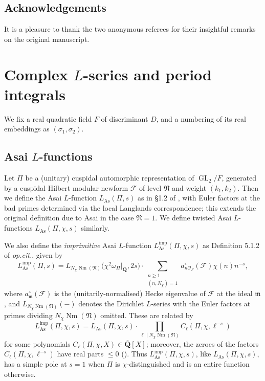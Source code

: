 \documentclass[a4paper,10pt]{amsart}
\theoremstyle{plain}
\theoremstyle{remark}
\DeclareMathOperator{\GL}{GL}
\DeclareMathOperator{\imp}{imp}
\DeclareMathOperator{\Nm}{Nm}
\DeclareMathOperator{\As}{As}
\newcommand{\QQbar}{\overline{\QQ}}
\newcommand{\QQ}{\mathbf{Q}}
\newcommand{\fN}{\mathfrak{N}}
\newcommand{\cF}{\mathcal{F}}
\newcommand{\cO}{\mathcal{O}}
\numberwithin{equation}{section}
\renewcommand{\le}{\leqslant}
\renewcommand{\ge}{\geqslant}
\begin{document}
 \subsection*{Acknowledgements} It is a pleasure to thank the two anonymous referees for their insightful remarks on the original manuscript.


\section{Complex $L$-series and period integrals}

 We fix a real quadratic field $F$ of discriminant $D$, and a numbering of its real embeddings as $(\sigma_1, \sigma_2)$.

 \subsection{Asai $L$-functions}

   Let $\Pi$ be a (unitary) cuspidal automorphic representation of $\GL_2 / F$, generated by a cuspidal Hilbert modular newform $\cF$ of level $\fN$ and weight $(k_1, k_2)$. Then we define the Asai $L$-function $L_{\As}(\Pi, s)$ as in \S 1.2 of \cite{grossiloefflerzerbesLfunct}, with Euler factors at the bad primes determined via the local Langlands correspondence; this extends the original definition due to Asai \cite{asai77} in the case $\fN = 1$. We define twisted Asai $L$-functions $L_{\As}(\Pi, \chi, s)$ similarly.

   We also define the \emph{imprimitive} Asai $L$-function $L_{\As}^{\imp}(\Pi, \chi, s)$ as Definition 5.1.2 of \emph{op.cit.}, given by
   \[
    L_{\As}^{\imp}(\Pi, s) = L_{N_\chi \Nm(\fN)} \Big(\chi^2 \omega_{\Pi} |_{\QQ}, 2s\Big) \cdot \sum_{\substack{n \ge 1 \\ (n, N_\chi) = 1}} a^\circ_{n \cO_F}(\cF) \chi(n) n^{-s},
   \]
   where $a^\circ_{\mathfrak{m}}(\cF)$ is the (unitarily-normalised) Hecke eigenvalue of $\cF$ at the ideal $\mathfrak{m}$, and $L_{N_\chi \Nm(\fN)}(-)$ denotes the Dirichlet $L$-series with the Euler factors at primes dividing $N_\chi \Nm(\fN)$ omitted. These are related by
   \[
    L^{\imp}_{\As}(\Pi, \chi, s) = L_{\As}(\Pi, \chi, s) \cdot \prod_{\ell \mid N_{\chi} \operatorname{Nm}(\fN)} C_\ell(\Pi, \chi, \ell^{-s})
   \]
   for some polynomials $C_\ell(\Pi, \chi, X) \in \QQbar[X]$; moreover, the zeroes of the factors $C_\ell(\Pi, \chi, \ell^{-s})$ have real parts $\le 0$ (\cite[Proposition 5.1.3]{leiloefflerzerbes18}). Thus $L^{\imp}_{\As}(\Pi, \chi, s)$, like $L_{\As}(\Pi, \chi, s)$, has a simple pole at $s = 1$ when $\Pi$ is $\chi$-distinguished and is an entire function otherwise.
\end{document}
